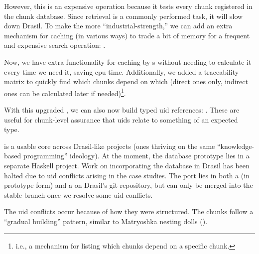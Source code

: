 \pseudoGrabAllChunksFromNewChunkDB{}

However, this is an expensive operation because it tests every chunk registered
in the chunk database. Since retrieval is a commonly performed task, it will
slow down Drasil. To make the \ChunkDB{} more ``industrial-strength,'' we can
add an extra mechanism for caching (in various ways) to trade a bit of memory
for a frequent and expensive search operation: .

\protoChunkDBHaskell{}

Now, we have extra functionality for caching by \TypeRep{}s without needing to
calculate it every time we need it, saving \acs{cpu} time. Additionally, we
added a traceability matrix to quickly find which chunks depend on which (direct
ones only, indirect ones can be calculated later if needed)\footnote{i.e., a
mechanism for listing which chunks depend on a specific chunk.}.

\protoTypedUIDHaskell{}

With this upgraded \ChunkDB{}, we can also now build typed \acs{uid} references:
. These are useful for chunk-level assurance that
\acsp{uid} relate to something of an expected type.

\ChunkDB{} is a usable core across Drasil-like projects (ones thriving on the
same ``knowledge-based programming'' ideology). At the moment, the database
prototype lies in a separate Haskell project. Work on incorporating the database
in Drasil has been halted due to \acs{uid} conflicts arising in the case
studies. The port lies in both a  (in prototype form) and a
 on Drasil's git
repository, but can only be merged into the stable branch once we resolve some
\acs{uid} conflicts.

\matryoshkaDollsImg{}

The \acs{uid} conflicts occur because of how they were structured. The chunks
follow a ``gradual building'' pattern, similar to Matryoshka nesting
dolls ().

\pseudoChunkNestingHaskell{}

